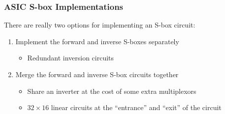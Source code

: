 \documentclass[handout,10pt]{beamer}
\begin{document}
\begin{frame}
	\frametitle{ASIC S-box Implementations}
	There are really two options for implementing an S-box circuit:
	\begin{enumerate}
		\item Implement the forward and inverse S-boxes separately
		\begin{itemize}
			\item Redundant inversion circuits
		\end{itemize}
		\pause 
		\item Merge the forward and inverse S-box circuits together
		\begin{itemize}
			\item Share an inverter at the cost of some extra multiplexors
			\item $32 \times 16$ linear circuits at the ``entrance'' and ``exit'' of the circuit
		\end{itemize}
	\end{enumerate}
\end{frame}



\end{document}
